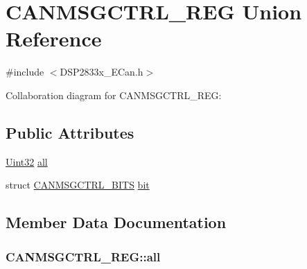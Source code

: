 \hypertarget{union_c_a_n_m_s_g_c_t_r_l___r_e_g}{}\section{C\+A\+N\+M\+S\+G\+C\+T\+R\+L\+\_\+\+R\+E\+G Union Reference}
\label{union_c_a_n_m_s_g_c_t_r_l___r_e_g}


{\ttfamily \#include $<$D\+S\+P2833x\+\_\+\+E\+Can.\+h$>$}



Collaboration diagram for C\+A\+N\+M\+S\+G\+C\+T\+R\+L\+\_\+\+R\+E\+G\+:
\subsection*{Public Attributes}
\begin{DoxyCompactItemize}
\item 
\hyperlink{_d_s_p2833x___device_8h_aba99025e657f892beb7ff31cecf64653}{Uint32} \hyperlink{union_c_a_n_m_s_g_c_t_r_l___r_e_g_ac9599c5f07f21809bcd4598c9753049e}{all}
\item 
struct \hyperlink{struct_c_a_n_m_s_g_c_t_r_l___b_i_t_s}{C\+A\+N\+M\+S\+G\+C\+T\+R\+L\+\_\+\+B\+I\+T\+S} \hyperlink{union_c_a_n_m_s_g_c_t_r_l___r_e_g_a8cb5d3114578fc67982fc440b7fcd32a}{bit}
\end{DoxyCompactItemize}


\subsection{Member Data Documentation}
\hypertarget{union_c_a_n_m_s_g_c_t_r_l___r_e_g_ac9599c5f07f21809bcd4598c9753049e}{}
\subsubsection[{all}]{ C\+A\+N\+M\+S\+G\+C\+T\+R\+L\+\_\+\+R\+E\+G\+::all}\label{union_c_a_n_m_s_g_c_t_r_l___r_e_g_ac9599c5f07f21809bcd4598c9753049e}
\hypertarget{union_c_a_n_m_s_g_c_t_r_l___r_e_g_a8cb5d3114578fc67982fc440b7fcd32a}{}
